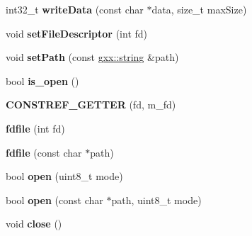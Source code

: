 \begin{DoxyCompactItemize}
\item 
int32\+\_\+t {\bfseries write\+Data} (const char $\ast$data, size\+\_\+t max\+Size)\hypertarget{classgxx_1_1io_1_1fdfile_aa6b10070a559b46de324b6a01e7ef7d5}{}\label{classgxx_1_1io_1_1fdfile_aa6b10070a559b46de324b6a01e7ef7d5}

\item 
void {\bfseries set\+File\+Descriptor} (int fd)\hypertarget{classgxx_1_1io_1_1fdfile_a0c30dc106a3dada39e830a2f39a11fed}{}\label{classgxx_1_1io_1_1fdfile_a0c30dc106a3dada39e830a2f39a11fed}

\item 
void {\bfseries set\+Path} (const \hyperlink{classgxx_1_1basic__string}{gxx\+::string} \&path)\hypertarget{classgxx_1_1io_1_1fdfile_a7d855019c768ee5d4f656d9289bf49ab}{}\label{classgxx_1_1io_1_1fdfile_a7d855019c768ee5d4f656d9289bf49ab}

\item 
bool {\bfseries is\+\_\+open} ()\hypertarget{classgxx_1_1io_1_1fdfile_afc7c22aef521c4466e4c6d19a40afd5e}{}\label{classgxx_1_1io_1_1fdfile_afc7c22aef521c4466e4c6d19a40afd5e}

\item 
{\bfseries C\+O\+N\+S\+T\+R\+E\+F\+\_\+\+G\+E\+T\+T\+ER} (fd, m\+\_\+fd)\hypertarget{classgxx_1_1io_1_1fdfile_acdee1a0d8c4f6ea45734ec8a421da42d}{}\label{classgxx_1_1io_1_1fdfile_acdee1a0d8c4f6ea45734ec8a421da42d}

\item 
{\bfseries fdfile} (int fd)\hypertarget{classgxx_1_1io_1_1fdfile_acd19f40ea5bddf489b5ba31e7e7e92b6}{}\label{classgxx_1_1io_1_1fdfile_acd19f40ea5bddf489b5ba31e7e7e92b6}

\item 
{\bfseries fdfile} (const char $\ast$path)\hypertarget{classgxx_1_1io_1_1fdfile_a91ed2c96d8b0f11743c757382c03856d}{}\label{classgxx_1_1io_1_1fdfile_a91ed2c96d8b0f11743c757382c03856d}

\item 
bool {\bfseries open} (uint8\+\_\+t mode)\hypertarget{classgxx_1_1io_1_1fdfile_a4136ebc1a0cb06959d77a3a208370499}{}\label{classgxx_1_1io_1_1fdfile_a4136ebc1a0cb06959d77a3a208370499}

\item 
bool {\bfseries open} (const char $\ast$path, uint8\+\_\+t mode)\hypertarget{classgxx_1_1io_1_1fdfile_a4385f6258e930936490b1783409e7064}{}\label{classgxx_1_1io_1_1fdfile_a4385f6258e930936490b1783409e7064}

\item 
void {\bfseries close} ()\hypertarget{classgxx_1_1io_1_1fdfile_a17938c189c1daf14bb540043ee0bb949}{}\label{classgxx_1_1io_1_1fdfile_a17938c189c1daf14bb540043ee0bb949}


\end{DoxyCompactItemize}
